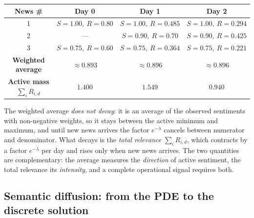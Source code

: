 \documentclass[a4paper,11pt]{article}
\begin{document}
\begin{table}[H]
\centering
\renewcommand{\arraystretch}{1.25}
\small
\begin{tabular}{|c|c|c|c|}
\hline
\textbf{News \#} & \textbf{Day 0} & \textbf{Day 1} & \textbf{Day 2} \\
\hline
1 & $S{=}1{.}00,\ R{=}0{.}80$ & $S{=}1{.}00,\ R{=}0{.}485$ & $S{=}1{.}00,\ R{=}0{.}294$ \\
2 & --- & $S{=}0{.}90,\ R{=}0{.}70$ & $S{=}0{.}90,\ R{=}0{.}425$ \\
3 & $S{=}0{.}75,\ R{=}0{.}60$ & $S{=}0{.}75,\ R{=}0{.}364$ & $S{=}0{.}75,\ R{=}0{.}221$ \\
\hline
\textbf{Weighted average} & $\approx 0{.}893$ & $\approx 0{.}896$ & $\approx 0{.}896$ \\
\hline
\textbf{Active mass $\sum_i R_{i,d}$} & $1{.}400$ & $1{.}549$ & $0{.}940$ \\
\hline
\end{tabular}
\end{table}

\noindent The weighted average \emph{does not decay}: it is an average of the observed sentiments with non-negative weights, so it stays between the active minimum and maximum, and until new news arrives the factor $e^{-\lambda}$ cancels between numerator and denominator. What decays is the \emph{total relevance} $\sum_i R_{i,d}$, which contracts by a factor $e^{-\lambda}$ per day and rises only when new news arrives. The two quantities are complementary: the average measures the \emph{direction} of active sentiment, the total relevance its \emph{intensity}, and a complete operational signal requires both.

\subsection{Semantic diffusion: from the PDE to the discrete solution}
\end{document}
